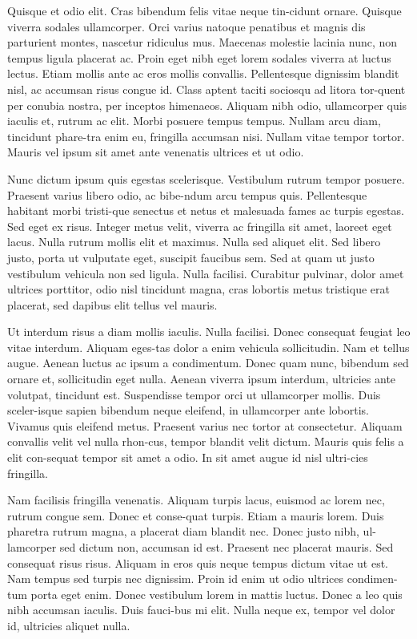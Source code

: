 ﻿\documentclass[10pt,a4paper,twocolumn,twoside]{article}
\begin{document}
Quisque et odio elit. Cras bibendum felis vitae neque tin-cidunt ornare. Quisque viverra sodales ullamcorper. Orci varius natoque penatibus et magnis dis parturient montes, nascetur ridiculus mus. Maecenas molestie lacinia nunc, non tempus ligula placerat ac. Proin eget nibh eget lorem sodales viverra at luctus lectus. Etiam mollis ante ac eros mollis convallis. Pellentesque dignissim blandit nisl, ac accumsan risus congue id. Class aptent taciti sociosqu ad litora tor-quent per conubia nostra, per inceptos himenaeos. Aliquam nibh odio, ullamcorper quis iaculis et, rutrum ac elit. Morbi posuere tempus tempus. Nullam arcu diam, tincidunt phare-tra enim eu, fringilla accumsan nisi. Nullam vitae tempor tortor. Mauris vel ipsum sit amet ante venenatis ultrices et ut odio. 

Nunc dictum ipsum quis egestas scelerisque. Vestibulum rutrum tempor posuere. Praesent varius libero odio, ac bibe-ndum arcu tempus quis. Pellentesque habitant morbi tristi-que senectus et netus et malesuada fames ac turpis egestas. Sed eget ex risus. Integer metus velit, viverra ac fringilla sit amet, laoreet eget lacus. Nulla rutrum mollis elit et maximus. Nulla sed aliquet elit. Sed libero justo, porta ut vulputate eget, suscipit faucibus sem. Sed at quam ut justo vestibulum vehicula non sed ligula. Nulla facilisi. Curabitur pulvinar, dolor amet ultrices porttitor, odio nisl tincidunt magna, cras lobortis metus tristique erat placerat, sed dapibus elit tellus vel mauris.

Ut interdum risus a diam mollis iaculis. Nulla facilisi. Donec consequat feugiat leo vitae interdum. Aliquam eges-tas dolor a enim vehicula sollicitudin. Nam et tellus augue. Aenean luctus ac ipsum a condimentum. Donec quam nunc, bibendum sed ornare et, sollicitudin eget nulla. Aenean viverra ipsum interdum, ultricies ante volutpat, tincidunt est. Suspendisse tempor orci ut ullamcorper mollis. Duis sceler-isque sapien bibendum neque eleifend, in ullamcorper ante lobortis. Vivamus quis eleifend metus. Praesent varius nec tortor at consectetur. Aliquam convallis velit vel nulla rhon-cus, tempor blandit velit dictum. Mauris quis felis a elit con-sequat tempor sit amet a odio. In sit amet augue id nisl ultri-cies fringilla. 

Nam facilisis fringilla venenatis. Aliquam turpis lacus, euismod ac lorem nec, rutrum congue sem. Donec et conse-quat turpis. Etiam a mauris lorem. Duis pharetra rutrum magna, a placerat diam blandit nec. Donec justo nibh, ul-lamcorper sed dictum non, accumsan id est. Praesent nec placerat mauris. Sed consequat risus risus. Aliquam in eros quis neque tempus dictum vitae ut est. Nam tempus sed turpis nec dignissim. Proin id enim ut odio ultrices condimen-tum porta eget enim. Donec vestibulum lorem in mattis luctus. Donec a leo quis nibh accumsan iaculis. Duis fauci-bus mi elit. Nulla neque ex, tempor vel dolor id, ultricies aliquet nulla.
\end{document}
